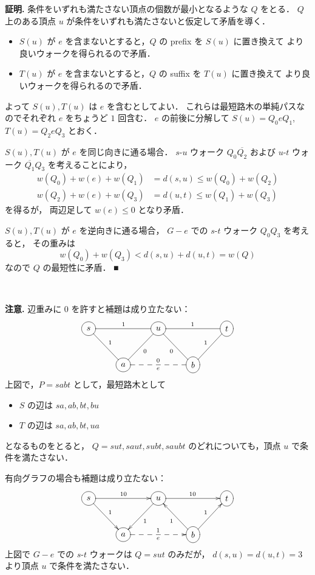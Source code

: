 \documentclass{jsarticle}
\begin{document}
\noindent\textbf{証明.}
条件をいずれも満たさない頂点の個数が最小となるような $Q$ をとる．
$Q$ 上のある頂点 $u$ が条件をいずれも満たさないと仮定して矛盾を導く．
\begin{itemize}
  \item $S(u)$ が $e$ を含まないとすると，$Q$ の prefix を $S(u)$ に置き換えて
      より良いウォークを得られるので矛盾．
  \item $T(u)$ が $e$ を含まないとすると，$Q$ の suffix を $T(u)$ に置き換えて
      より良いウォークを得られるので矛盾．
\end{itemize}

よって $S(u), T(u)$ は $e$ を含むとしてよい．
これらは最短路木の単純パスなのでそれぞれ $e$ をちょうど $1$ 回含む．
$e$ の前後に分解して $S(u) = Q_0 e Q_1$, $T(u) = Q_2 e Q_3$ とおく．

$S(u), T(u)$ が $e$ を同じ向きに通る場合．
$s$-$u$ ウォーク $Q_0 \overline{Q_2}$ および
$u$-$t$ ウォーク $\overline{Q_1} Q_3$ を考えることにより，
\begin{align*}
  w(Q_0) + w(e) + w(Q_1) &= d(s, u) \le w(Q_0) + w(Q_2) \\
  w(Q_2) + w(e) + w(Q_3) &= d(u, t) \le w(Q_1) + w(Q_3)
\end{align*}
を得るが，
両辺足して $w(e) \le 0$ となり矛盾．

$S(u), T(u)$ が $e$ を逆向きに通る場合，
$G-e$ での $s$-$t$ ウォーク $Q_0 Q_3$ を考えると，
その重みは
\[
  w(Q_0) + w(Q_3) < d(s, u) + d(u, t) = w(Q)
\]
なので $Q$ の最短性に矛盾．
\hfill ■

\

\noindent\textbf{注意.}
辺重みに $0$ を許すと補題は成り立たない：
\[
  \xymatrix{
    *++[o][F]{s} \ar@{-}[rd]^1 \ar@{-}[rr]^1 & & *++[o][F]{u} \ar@{-}[ld]^0 \ar@{-}[rr]^1 & & *++[o][F]{t} \\
    & *++[o][F]{a} \ar@{--}[rr]^0_e & & *++[o][F]{b} \ar@{-}[lu]^0 \ar@{-}[ru]^1 &
  }
\]
上図で，$P = sabt$ として，最短路木として
\begin{itemize}
  \item $S$ の辺は $sa, ab, bt, bu$
  \item $T$ の辺は $sa, ab, bt, ua$
\end{itemize}
となるものをとると，
$Q = sut, saut, subt, saubt$ のどれについても，頂点 $u$ で条件を満たさない．

有向グラフの場合も補題は成り立たない：
\[
  \xymatrix{
    *++[o][F]{s} \ar[rd]^1 \ar[rr]^{10} & & *++[o][F]{u} \ar[ld]^1 \ar[rr]^{10} & & *++[o][F]{t} \\
    & *++[o][F]{a} \ar@{-->}[rr]^1_e & & *++[o][F]{b} \ar[lu]^1 \ar[ru]^1 &
  }
\]
上図で $G-e$ での $s$-$t$ ウォークは $Q = sut$ のみだが，
$d(s, u) = d(u, t) = 3$ より頂点 $u$ で条件を満たさない．
\end{document}
